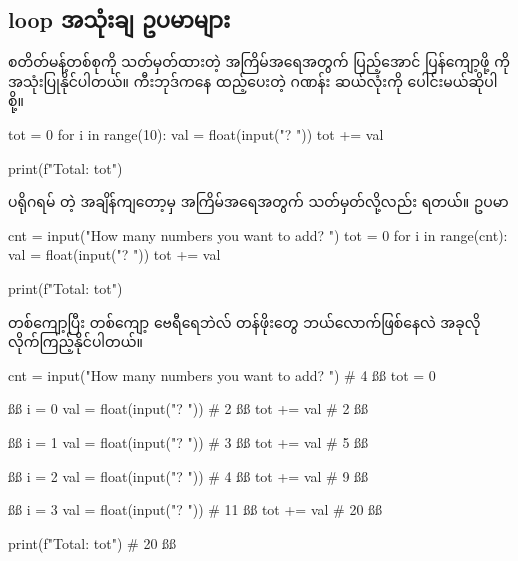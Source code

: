 \subsection*{ loop အသုံးချ ဥပမာများ}
စတိတ်မန့်တစ်စုကို သတ်မှတ်ထားတဲ့  အကြိမ်အရေအတွက်  ပြည့်အောင် ပြန်ကျော့ဖို့   ကို အသုံးပြုနိုင်ပါတယ်။ ကီးဘုဒ်ကနေ ထည့်ပေးတဲ့ ဂဏန်း ဆယ်လုံးကို ပေါင်းမယ်ဆိုပါစို့။ 
%
\begin{py}
tot = 0
for i in range(10):
    val = float(input("? "))
    tot += val

print(f"Total: {tot}")
\end{py}
%
ပရိုဂရမ်  တဲ့ အချိန်ကျတော့မှ အကြိမ်အရေအတွက် သတ်မှတ်လို့လည်း ရတယ်။ ဥပမာ
%
\begin{py}
cnt = input("How many numbers you want to add? ")
tot = 0
for i in range(cnt):
    val = float(input("? "))
    tot += val

print(f"Total: {tot}")
\end{py}
%

 တစ်ကျော့ပြီး တစ်ကျော့ ဗေရီရေဘဲလ် တန်ဖိုးတွေ ဘယ်လောက်ဖြစ်နေလဲ အခုလို လိုက်ကြည့်နိုင်ပါတယ်။
\begin{py}
cnt = input("How many numbers you want to add? ") # 4 ßß
tot = 0

ßß
i = 0
val = float(input("? "))    # 2 ßß
tot += val                  # 2 ßß

ßß
i = 1
val = float(input("? "))    # 3 ßß
tot += val                  # 5 ßß

ßß
i = 2
val = float(input("? "))    # 4 ßß
tot += val                  # 9 ßß

ßß
i = 3
val = float(input("? "))    # 11 ßß
tot += val                  # 20 ßß

print(f"Total: {tot}")      # 20 ßß

\end{py}

